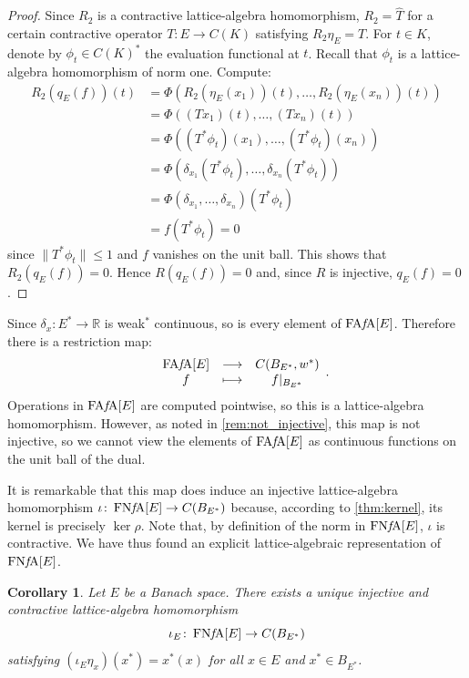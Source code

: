 \documentclass{memo-l}
\newtheorem{cor}[theorem]{Corollary}
\theoremstyle{definition}
\theoremstyle{remark}
\numberwithin{section}{chapter}
\numberwithin{equation}{chapter}
\newcommand\R{\ensuremath{\mathbb{R}}}
\newcommand{\FAFAv}[1]{\operatorname{FA{\it f}\!A}[#1]}
\newcommand{\FNFA}[1]{\operatorname{FN{\it f}\!A}[#1]}
\begin{document}
\begin{proof}
    Since $R_2$ is a
    contractive lattice-algebra homomorphism, $R_2=\hat{T}$
    for a certain contractive operator $T\colon E\to C(K)$ satisfying
    $R_2\eta _E=T$. For $t \in K$, denote by $\phi _t \in C(K)^{*}$ the
    evaluation functional at $t$. Recall that $\phi _t$ is a
    lattice-algebra homomorphism of norm one. Compute:
    \begin{align*}
        R_2(q_E(f))(t)&=\Phi (R_2(\eta _E(x_1))(t),\ldots ,R_2(\eta
        _E(x_n))(t))\\
                      &=\Phi ((Tx_1)(t),\ldots ,(Tx_n)(t))\\
                      &=\Phi ( (T^{*}\phi _t)(x_1),\ldots
                      ,(T^{*}\phi  _t)(x_n))\\
                      &=\Phi (\delta _{x_1}(T^{*}\phi _t),\ldots,
                      \delta _{x_n}(T^{*}\phi _t))\\
                      &=\Phi (\delta _{x_1},\ldots ,\delta
                      _{x_n})(T^{*}\phi _t)\\
                      &=f(T^{*}\phi _t)=0
    \end{align*}
    since $\|T^{*}\phi _t\|\le 1$ and $f$ vanishes on the unit ball.
    This shows that $R_2(q_E(f))=0$. Hence $R(q_E(f))=0$ and, since $R$
    is injective, $q_E(f)=0$.
\end{proof}

Since $\delta _x\colon E^{*}\to \R$ is weak$^*$ continuous, so is every
element of $\FAFAv E$. Therefore there is a restriction map:
\[
\begin{array}{cccc}
        & \FAFAv E & \longrightarrow & C(B_{E^{*}},w^{*}) \\
        & f & \longmapsto & f|_{B_{E^{*}}} \\
\end{array}.
\]
Operations in $\FAFAv E$ are computed pointwise, so this is a
lattice-algebra homomorphism. However, as noted in
\cref{rem:not_injective}, this map is not injective, so
we cannot view the elements of $\FAFAv E$ as continuous functions on
the unit ball of the dual.

It is remarkable that this map does induce an injective
lattice-algebra homomorphism $\iota \colon \FNFA E\to C(B_{E^{*}})$
because, according to \cref{thm:kernel}, its kernel is precisely $\ker
\rho $. Note that, by definition of the norm in $\FNFA E$, $\iota $ is
contractive. We have thus found an explicit lattice-algebraic
representation of $\FNFA E$.

\begin{cor}\label{cor:iota}
    Let $E$ be a Banach space. There exists a unique injective and
    contractive lattice-algebra homomorphism
    \[
    \iota_E \colon \FNFA E\to C(B_{E^{*}})
    \]
    satisfying $(\iota_E \eta _x)(x^{*})=x^{*}(x)$ for all $x \in E$ and
    $x^{*} \in B_{E^{*}}$.
\end{cor}
\end{document}

